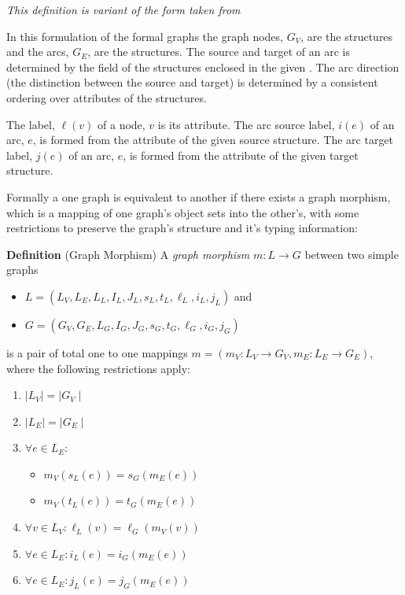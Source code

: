 \documentclass{cekarticle}
\begin{document}
\emph{This definition is variant of the form taken from
\citep{rudolf:1998}}

In this formulation of the formal graphs
the graph nodes, $G_{V}$, are the  structures and
the arcs, $G_{E}$, are the 
structures.  The source and target of an arc is determined by the  field
of the  structures enclosed in the given .
The arc direction (the distinction between the source and target) is determined by a consistent ordering
over  attributes of the  structures.

The label, $\ell(v)$ of a node, $v$ is its
 attribute.  The arc source label, $i(e)$ of an arc, $e$, is formed from the
 attribute of the given source  structure.
The arc target label, $j(e)$ of an arc, $e$, is formed from the
 attribute of the given target  structure.

Formally a one graph is equivalent to another if there exists a
graph morphism, which is a mapping of one graph's object sets into
the other's, with some restrictions to preserve the graph's
structure and it's typing information:

\textbf{Definition} (Graph Morphism) A \emph{graph morphism} $m : L \rightarrow G$ between two
simple graphs
\begin{itemize}
\item $L = (L_{V}, L_{E}, L_{L}, I_{L}, J_{L}, s_{L}, t_{L}, \ell_{L}, i_{L}, j_{L})$ and
\item $G = (G_{V}, G_{E}, L_{G}, I_{G}, J_{G}, s_{G}, t_{G}, \ell_{G}, i_{G}, j_{G})$
\end{itemize}
is a pair of total one to one mappings $m = (m_{V} : L_{V}
\rightarrow G_{V}, m_{E} : L_{E} \rightarrow G_{E})$, where the
following restrictions apply:

\begin{enumerate}
\item $\mid L_{V} \mid = \mid G_{V} \mid$

\item $\mid L_{E} \mid = \mid G_{E} \mid$

\item $\forall e \in L_{E} : $
    \begin{itemize}
    \item $m_{V}(s_{L}(e))= s_{G}(m_{E}(e))$
    \item $m_{V}(t_{L}(e))= t_{G}(m_{E}(e))$
    \end{itemize}
\item $\forall v \in L_{V} : \ell_{L}(v) = \ell_{G}(m_{V}(v))$
\item $\forall e \in L_{E} : i_{L}(e) = i_{G}(m_{E}(e))$
\item $\forall e \in L_{E} : j_{L}(e) = j_{G}(m_{E}(e))$
\end{enumerate}
\end{document}
